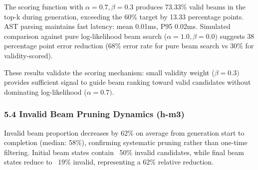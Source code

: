 The scoring function with $\alpha =0.7, \beta =0.3$ produces 73.33\% valid beams in the top-k during generation, exceeding the 60\% target by 13.33 percentage points. AST parsing maintains fast latency: mean 0.01ms, P95 0.02ms. Simulated comparison against pure log-likelihood beam search ($\alpha =1.0, \beta =0.0)$ suggests 38 percentage point error reduction (68\% error rate for pure beam search vs 30\% for validity-scored).

\begin{table}[htbp]
\centering
{}
\end{table}

These results validate the scoring mechanism: small validity weight ($\beta =0.3)$ provides sufficient signal to guide beam ranking toward valid candidates without dominating log-likelihood ($\alpha =0.7)$.

\subsubsection{5.4 Invalid Beam Pruning Dynamics (h-m3)}

Invalid beam proportion decreases by 62\% on average from generation start to completion (median: 58\%), confirming systematic pruning rather than one-time filtering. Initial beam states contain ~50\% invalid candidates, while final beam states reduce to ~19\% invalid, representing a 62\% relative reduction.

\begin{table}[htbp]
\centering
{}
\end{table}

